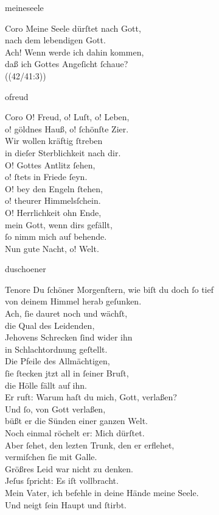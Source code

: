 \documentclass[shorttitlesize=55,tocstyle=ref-genre]{ees}
\begin{document}
{\begin{movement}{meineseele}
  \item[Coro]
  Meine Seele dürſtet nach Gott,\\
  nach dem lebendigen Gott.\\
  Ach! Wenn werde ich dahin kommen,\\
  daß ich Gottes Angeſicht ſchaue?\\
  ((42/41:3))
\end{movement}

\begin{movement}{ofreud}
  \item[Coro]
  O! Freud, o! Luſt, o! Leben,\\
  o! göldnes Hauß, o! ſchönſte Zier.\\
  Wir wollen kräftig ſtreben\\
  in dieſer Sterblichkeit nach dir.\\
  O! Gottes Antlitz ſehen,\\
  o! ſtets in Friede ſeyn.\\
  O! bey den Engeln ſtehen,\\
  o! theurer Himmelsſchein.\\
  O! Herrlichkeit ohn Ende,\\
  mein Gott, wenn dirs gefällt,\\
  ſo nimm mich auf behende.\\
  Nun gute Nacht, o! Welt.
\end{movement}

\begin{movement}{duschoener}
  \item[Tenore]
  Du ſchöner Morgenſtern, wie biſt du doch ſo tief\\
  von deinem Himmel herab geſunken.\\
  Ach, ſie dauret noch und wächſt,\\
  die Qual des Leidenden,\\
  Jehovens Schrecken ſind wider ihn\\
  in Schlachtordnung geſtellt.\\
  Die Pfeile des Allmächtigen,\\
  ſie ſtecken jtzt all in ſeiner Bruſt,\\
  die Hölle fällt auf ihn.\\
  Er ruft: Warum haſt du mich, Gott, verlaßen?\\
  Und ſo, von Gott verlaßen,\\
  büßt er die Sünden einer ganzen Welt.\\
  Noch einmal röchelt er: Mich dürſtet.\\
  Aber ſehet, den lezten Trunk, den er erflehet,\\
  vermiſchen ſie mit Galle.\\
  Größres Leid war nicht zu denken.\\
  Jeſus ſpricht: Es iſt vollbracht.\\
  Mein Vater, ich befehle in deine Hände meine Seele.\\
  Und neigt ſein Haupt und ſtirbt.


\end{movement}}
\end{document}

